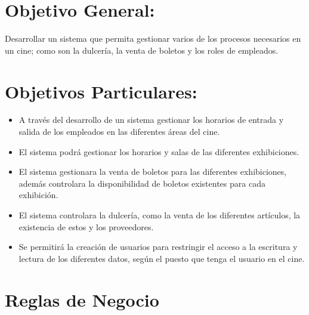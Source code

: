 \documentclass[11pt, fleqn]{article}                             %
\begin{document}
\clearpage

    \section{Objetivo General:}

        Desarrollar un sistema que permita gestionar varios de los procesos necesarios en un cine;
        como son la dulcería, la venta de boletos y los roles de empleados.


    \section{Objetivos Particulares:}
    
        \begin{itemize}
            \item A través del desarrollo de un sistema gestionar los horarios de entrada y
                salida de los empleados en las diferentes áreas del cine.
            
            \item El sistema podrá gestionar los horarios y salas de las diferentes exhibiciones.

            \item El sistema gestionara la venta de boletos para las diferentes exhibiciones,
                además controlara la disponibilidad de boletos existentes para cada exhibición.

            \item El sistema controlara la dulcería, como la venta de los diferentes artículos,
                la existencia de estos y los proveedores.

            \item Se permitirá la creación de usuarios para restringir el acceso a la escritura y
                lectura de los diferentes datos, según el puesto que tenga el usuario en el cine.

        \end{itemize}


\section{Reglas de Negocio}
\end{document}
